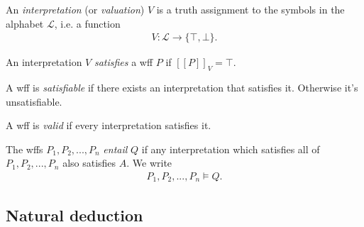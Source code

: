 \documentclass{article}
\begin{document}
\begin{definition}
    An \emph{interpretation} (or \emph{valuation}) $V$ is a truth assignment
    to the symbols in the alphabet $\mathcal{L}$, i.e. a function
    \begin{align*}
        V:\mathcal{L}\to \{\top,\bot\}.
    \end{align*}
\end{definition}

\begin{definition}
    An interpretation $V$ \emph{satisfies} a wff $P$ if $[\![ P]\!]_V=\top$.
\end{definition}

\begin{definition}
    A wff is \emph{satisfiable} if there exists an interpretation that satisfies it.
    Otherwise it's unsatisfiable.
\end{definition}

\begin{definition}
    A wff is \emph{valid} if every interpretation satisfies it.
\end{definition}

\begin{definition}
    The wffs $P_1, P_2,...,P_n$ \emph{entail} $Q$ if any interpretation
    which satisfies all of $P_1, P_2,...,P_n$ also satisfies $A$.
    We write 
    \begin{align*}
        P_1, P_2, ..., P_n \vDash Q.
    \end{align*}
\end{definition}

\subsection{Natural deduction}
\end{document}
